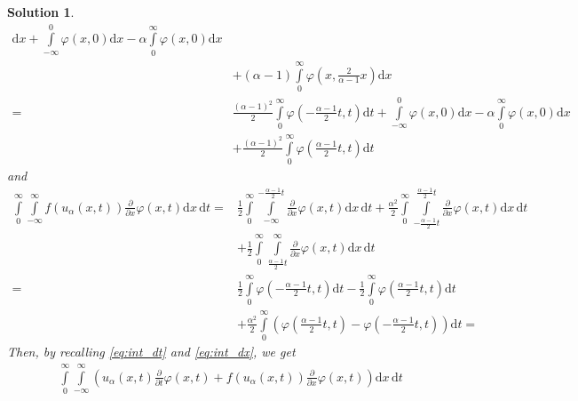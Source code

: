 \documentclass[10pt,letterpaper]{article}
\theoremstyle{break}
\newtheorem{solution}{Solution}
\begin{document}
\begin{solution}
\begin{equation}
\begin{aligned}
    	\text{d}x
    	+
    	\int\limits_{-\infty}^{0}
    	\varphi
    	\left(x,0\right)
    	\text{d}x
    	-\alpha
    	\int\limits_{0}^{\infty}
    	\varphi
    	\left(x,0\right)
    	\text{d}x \\
    	&
    	+
    	(\alpha-1)
    	\int\limits_{0}^{\infty}
    	\varphi
    	\left(x,\frac{2}{\alpha-1}x\right)
    	\text{d}x
    	\\
    	=
    	&
    	\frac{(\alpha-1)^2}{2}
    	\int\limits_{0}^{\infty}
    	\varphi
    	\left(-\frac{\alpha-1}{2}t,t\right)
    	\text{d}t
    	+
    	\int\limits_{-\infty}^{0}
    	\varphi
    	\left(x,0\right)
    	\text{d}x
    	-\alpha
    	\int\limits_{0}^{\infty}
    	\varphi
    	\left(x,0\right)
    	\text{d}x \\
    	&
    	+
    	\frac{(\alpha-1)^2}{2}
    	\int\limits_{0}^{\infty}
    	\varphi
    	\left(\frac{\alpha-1}{2}t,t\right)
    	\text{d}t
    \end{aligned}
    \end{equation}
    and
    \begin{equation}\label{eq:int_dx}
    \begin{aligned}
    	\int\limits_{0}^{\infty}
    	\int\limits_{-\infty}^{\infty}
    	f(u_\alpha(x,t))
    	\frac{\partial}{\partial x} \varphi(x,t)
    	\text{d}x\, \text{d}t
    	=
    	&
    	\frac{1}{2}
    	\int\limits_{0}^{\infty}
    	\int\limits_{-\infty}^{-\frac{\alpha-1}{2}t}
    	\frac{\partial}{\partial x} \varphi(x,t)
    	\text{d}x\, \text{d}t
    	+
    	\frac{\alpha^2}{2}
    	\int\limits_{0}^{\infty}
    	\int\limits_{-\frac{\alpha-1}{2}t}^{\frac{\alpha-1}{2}t}
    	\frac{\partial}{\partial x} \varphi(x,t)
    	\text{d}x\, \text{d}t \\
    	&
    	+
    	\frac{1}{2}
    	\int\limits_{0}^{\infty}
    	\int\limits_{\frac{\alpha-1}{2}t}^{\infty}
    	\frac{\partial}{\partial x} \varphi(x,t)
    	\text{d}x\, \text{d}t \\
    	=
    	&
    	\frac{1}{2}
    	\int\limits_{0}^{\infty}
    	\varphi
    	\left(
    		-\frac{\alpha-1}{2}t,t
    	\right)
    	\text{d}t
    	-
    	\frac{1}{2}
    	\int\limits_{0}^{\infty}
    	\varphi
    		\left(
    			\frac{\alpha-1}{2}t,t
    		\right)
    	\text{d}t \\
    	&
    	+
    	\frac{\alpha^2}{2}
    	\int\limits_{0}^{\infty}
    	\left(
    		\varphi
    		\left(
    			\frac{\alpha-1}{2}t,t
    		\right)
    		-
    		\varphi
    		\left(
    			-\frac{\alpha-1}{2}t,t
    		\right)
    	\right)
    	\text{d}t
    	=
    \end{aligned}
    \end{equation}
    Then, by recalling \eqref{eq:int_dt} and \eqref{eq:int_dx}, we get
    \begin{align}
    	\int\limits_{0}^{\infty}
    	\int\limits_{-\infty}^{\infty}
    	\left(
    		u_\alpha(x,t)
    		\frac{\partial}{\partial t} \varphi(x,t)
    		+
    		f(u_\alpha(x,t))
    		\frac{\partial}{\partial x} \varphi(x,t)
    	\right)
    	\text{d}x\, \text{d}t
    \end{align}
\end{solution}
\end{document}
